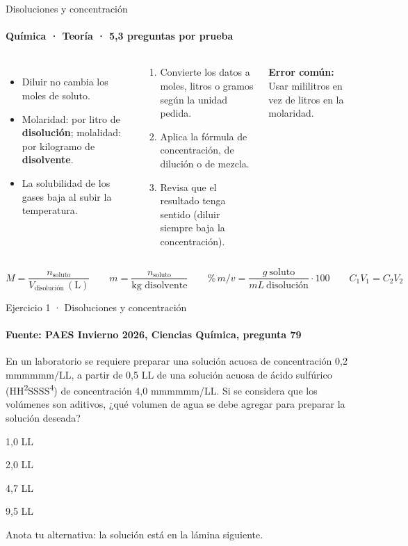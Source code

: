 \documentclass[aspectratio=169,11pt]{beamer}
\newcommand{\alternativa}[2]{\begin{opcion}\tecla{#1}\hspace{0.6em}#2\end{opcion}}
\newlength{\ajustealto}
\newenvironment{ajustar}[1][0.74\textheight]
  {\setlength{\ajustealto}{#1}\begin{lrbox}{\ajustecaja}\begin{minipage}{\textwidth}}
  {\end{minipage}\end{lrbox}%
   \ifdim\dimexpr\ht\ajustecaja+\dp\ajustecaja\relax>\ajustealto
     \resizebox*{!}{\ajustealto}{\usebox{\ajustecaja}}\else\usebox{\ajustecaja}\fi}
\begin{document}
\begin{frame}{Disoluciones y concentración}
\label{tema-cs-disoluciones}
\framesubtitle{Química · Teoría · 5,3 preguntas por prueba}
\begin{ajustar}
\begin{columns}[T,onlytextwidth]
\begin{itemize}\footnotesize
\item Diluir no cambia los moles de soluto.
\item Molaridad: por litro de \textbf{disolución}; molalidad: por kilogramo de \textbf{disolvente}.
\item La solubilidad de los gases baja al subir la temperatura.
\end{itemize}
\begin{cajaregla}\scriptsize \begin{enumerate}\item Convierte los datos a moles, litros o gramos según la unidad pedida.\item Aplica la fórmula de concentración, de dilución o de mezcla.\item Revisa que el resultado tenga sentido (diluir siempre baja la concentración).\end{enumerate}\end{cajaregla}
\begin{notagris}\scriptsize \textbf{Error común:} Usar mililitros en vez de litros en la molaridad.\end{notagris}
\end{columns}
\begin{cajaclave}[Fórmulas]\footnotesize
\[M=\frac{n_{\text{soluto}}}{V_{\text{disolución}}\,(\text{L})} \quad\quad m=\frac{n_{\text{soluto}}}{\text{kg disolvente}} \quad\quad \%\,m/v=\frac{g\ \text{soluto}}{mL\ \text{disolución}}\cdot 100 \quad\quad C_1V_1=C_2V_2\]
\end{cajaclave}
\end{ajustar}
\end{frame}

\begin{frame}{Ejercicio 1 · Disoluciones y concentración}
\framesubtitle{Fuente: PAES Invierno 2026, Ciencias Química, pregunta 79}
\begin{ajustar}[0.7\textheight]
{\small En un laboratorio se requiere preparar una solución acuosa de concentración 0,2 mmmmmm/LL, a partir de 0,5 LL de una solución acuosa de ácido sulfúrico (HH\textsuperscript{2}SSSS\textsuperscript{4}) de concentración 4,0 mmmmmm/LL. Si se considera que los volúmenes son aditivos, ¿qué volumen de agua se debe agregar para preparar la solución deseada?}
\vspace{0.4em}
\alternativa{A}{1,0 LL}
\alternativa{B}{2,0 LL}
\alternativa{C}{4,7 LL}
\alternativa{D}{9,5 LL}
\end{ajustar}
\vfill{\tiny\color{zinc500}\hfill Anota tu alternativa: la solución está en la lámina siguiente.}
\end{frame}
\end{document}
